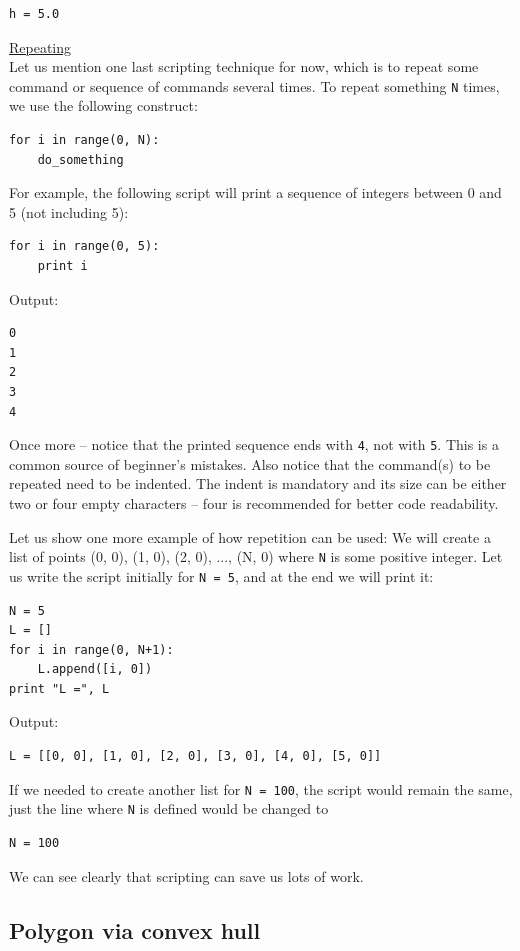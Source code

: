 \documentclass{article}
\begin{document}
\begin{verbatim}
h = 5.0
\end{verbatim} 
\vspace{4mm}
\underline{Repeating}\\

\noindent
Let us mention one last scripting technique for now, which is to repeat 
some command or sequence of commands several times. To repeat something 
{\tt N} times, we use the following construct: 

\begin{verbatim}
for i in range(0, N):
    do_something
\end{verbatim}
For example, the following script will print a sequence of integers between 
0 and 5 (not including 5):

\begin{verbatim}
for i in range(0, 5):
    print i
\end{verbatim}
Output:

\begin{verbatim}
0
1
2
3
4
\end{verbatim}
Once more -- notice that the printed sequence ends with {\tt 4}, not with {\tt 5}.
This is a common source of beginner's mistakes.
Also notice that the command(s) to be repeated need to be indented. The indent is mandatory and 
its size can be either two or four empty characters -- four is recommended for better
code readability.

Let us show one more example of how repetition can be used: We will create a list of 
points (0, 0), (1, 0), (2, 0), ..., (N, 0) where {\tt N} is some positive integer. Let us
write the script initially for {\tt N = 5}, and at the end we will print it:

\begin{verbatim}
N = 5
L = []
for i in range(0, N+1):
    L.append([i, 0])
print "L =", L
\end{verbatim}
Output:
\begin{verbatim}
L = [[0, 0], [1, 0], [2, 0], [3, 0], [4, 0], [5, 0]]
\end{verbatim}
If we needed to create another list for {\tt N = 100}, the script would remain the same,
just the line where {\tt N} is defined would be changed to 

\begin{verbatim}
N = 100
\end{verbatim}
We can see clearly that scripting can save us lots of work.

\subsection{Polygon via convex hull}\label{subsec:polygon}
\end{document}
